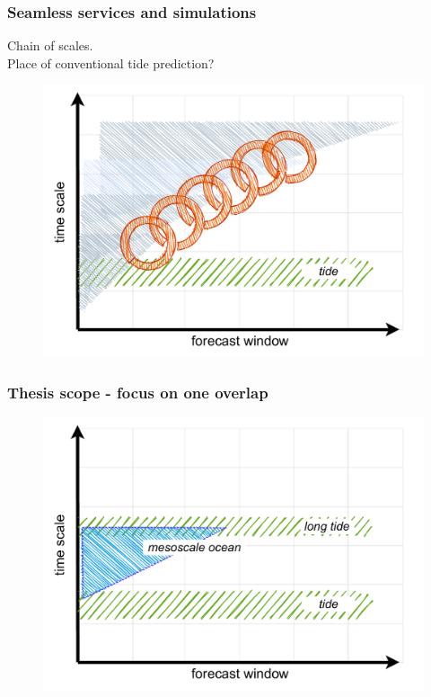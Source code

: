 \begin{frame}
\frametitle{Seamless services and simulations }
Chain of scales.\\
Place of conventional tide prediction?
    \begin{figure}      
     \includegraphics[height=0.8\textheight]{figures/diagrams/scales_with_chain.pdf}
    \end{figure} 
\end{frame}
\begin{frame}
\frametitle{Thesis scope - focus on one overlap}
    \begin{figure}      
     \includegraphics[height=0.8\textheight]{figures/diagrams/scales_focus.pdf}
    \end{figure} 
\end{frame}
